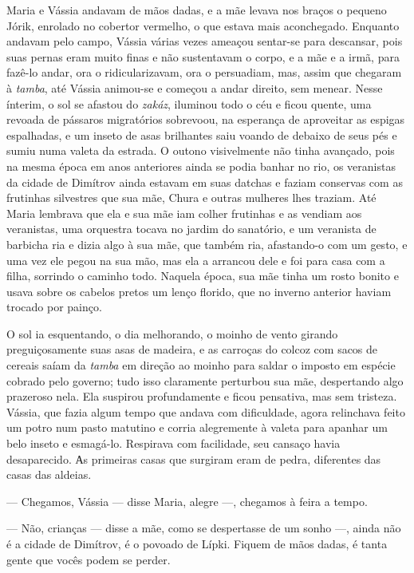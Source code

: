 Maria e Vássia andavam de mãos dadas, e a mãe levava nos braços o
pequeno Jórik, enrolado no cobertor vermelho, o que estava mais
aconchegado. Enquanto andavam pelo campo, Vássia várias vezes ameaçou
sentar-se para descansar, pois suas pernas eram muito finas e não
sustentavam o corpo, e a mãe e a irmã, para fazê-lo andar, ora o
ridicularizavam, ora o persuadiam, mas, assim que chegaram à
\emph{tamba}, até Vássia animou-se e começou a andar direito, sem
menear. Nesse ínterim, o sol se afastou do \emph{zakáz}, iluminou todo o
céu e ficou quente, uma revoada de pássaros migratórios sobrevoou, na
esperança de aproveitar as espigas espalhadas, e um inseto de asas
brilhantes saiu voando de debaixo de seus pés e sumiu numa valeta da
estrada. O outono visivelmente não tinha avançado, pois na mesma época
em anos anteriores ainda se podia banhar no rio, os veranistas da cidade
de Dimítrov ainda estavam em suas datchas e faziam conservas com as
frutinhas silvestres que sua mãe, Chura e outras mulheres lhes traziam.
Até Maria lembrava que ela e sua mãe iam colher frutinhas e as vendiam
aos veranistas, uma orquestra tocava no jardim do sanatório, e um
veranista de barbicha ria e dizia algo à sua mãe, que também ria,
afastando-o com um gesto, e uma vez ele pegou na sua mão, mas ela a
arrancou dele e foi para casa com a filha, sorrindo o caminho todo.
Naquela época, sua mãe tinha um rosto bonito e usava sobre os cabelos
pretos um lenço florido, que no inverno anterior haviam trocado por
painço.

O sol ia esquentando, o dia melhorando, o moinho de vento girando
preguiçosamente suas asas de madeira, e as carroças do colcoz com sacos
de cereais saíam da \emph{tamba} em direção ao moinho para saldar o
imposto em espécie cobrado pelo governo; tudo isso claramente perturbou
sua mãe, despertando algo prazeroso nela. Ela suspirou profundamente e
ficou pensativa, mas sem tristeza. Vássia, que fazia algum tempo que
andava com dificuldade, agora relinchava feito um potro num pasto
matutino e corria alegremente à valeta para apanhar um belo inseto e
esmagá-lo. Respirava com facilidade, seu cansaço havia desaparecido. Аs
primeiras casas que surgiram eram de pedra, diferentes das casas das
aldeias.

--- Chegamos, Vássia --- disse Maria, alegre ---, chegamos à feira a
tempo.

--- Não, crianças --- disse a mãe, como se despertasse de um sonho ---,
ainda não é a cidade de Dimítrov, é o povoado de Lípki. Fiquem de mãos
dadas, é tanta gente que vocês podem se perder.

